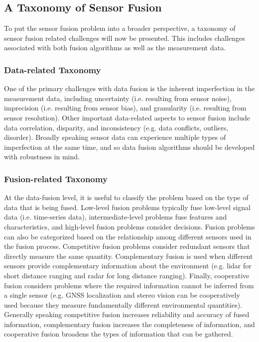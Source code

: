 \subsection{A Taxonomy of Sensor Fusion}
To put the sensor fusion problem into a broader perspective, a taxonomy of sensor fusion related challenges will now be presented. This includes challenges associated with both fusion algorithms as well as the measurement data.

\subsubsection{Data-related Taxonomy}
One of the primary challenges with data fusion is the inherent imperfection in the measurement data, including uncertainty (i.e. resulting from sensor noise), imprecision (i.e. resulting from sensor bias), and granularity (i.e. resulting from sensor resolution). Other important data-related aspects to sensor fusion include data correlation, disparity, and inconsistency (e.g. data conflicts, outliers, disorder). Broadly speaking sensor data can experience multiple types of imperfection at the same time, and so data fusion algorithms should be developed with robustness in mind.

\subsubsection{Fusion-related Taxonomy}
At the data-fusion level, it is useful to classify the problem based on the type of data that is being fused. Low-level fusion problems typically fuse low-level signal data (i.e. time-series data), intermediate-level problems fuse features and characteristics, and high-level fusion problems consider decisions. Fusion problems can also be categorized based on the relationship among different sensors used in the fusion process. Competitive fusion problems consider redundant sensors that directly measure the same quantity. Complementary fusion is used when different sensors provide complementary information about the environment (e.g. lidar for short distance ranging and radar for long distance ranging). Finally, cooperative fusion considers problems where the required information cannot be inferred from a single sensor (e.g. GNSS localization and stereo vision can be cooperatively used because they measure fundamentally different environmental quantities). Generally speaking competitive fusion increases reliability and accuracy of fused information, complementary fusion increases the completeness of information, and cooperative fusion broadens the types of information that can be gathered.

